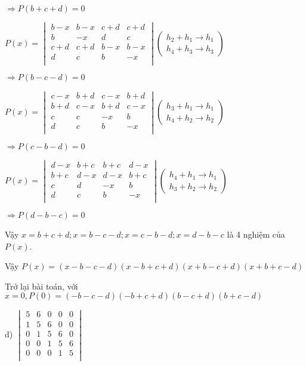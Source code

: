 \documentclass[12pt]{report}
\begin{document}
$\Rightarrow P(b+c+d) = 0$

$P(x) = \begin{vmatrix}
	b-x & b-x & c+d & c+d \\
	b & -x & d & c \\
	c+d & c+d & b-x & b-x \\
	d & c & b & -x \\
\end{vmatrix} \left( \begin{smallmatrix}
h_2+h_1 \to h_1\\
h_4+h_3 \to h_3
\end{smallmatrix} \right)$

$\Rightarrow P(b-c-d) = 0$

$P(x) = \begin{vmatrix}
	c-x & b+d & c-x & b+d \\
	b+d & c-x & b+d & c-x \\
	c & c & -x & b \\
	d & c & b & -x \\
\end{vmatrix} \left( \begin{smallmatrix}
	h_3+h_1 \to h_1\\
	h_4+h_2 \to h_2
\end{smallmatrix} \right)$

$\Rightarrow P(c-b-d) = 0$

$P(x) = \begin{vmatrix}
	d-x & b+c & b+c & d-x \\
	b+c & d-x & d-x & b+c \\
	c & d & -x & b \\
	d & c & b & -x \\
\end{vmatrix} \left( \begin{smallmatrix}
	h_4+h_1 \to h_1\\
	h_3+h_2 \to h_2
\end{smallmatrix} \right)$

$\Rightarrow P(d-b-c) = 0$

Vậy $x=b+c+d; x=b-c-d; x=c-b-d; x=d-b-c$ là 4 nghiệm của $P(x)$.

Vậy $P(x)=(x-b-c-d)(x-b+c+d)(x+b-c+d)(x+b+c-d)$  

Trở lại bài toán, với $x = 0, P(0) = (-b-c-d)(-b+c+d)(b-c+d)(b+c-d)$

d) $\begin{vmatrix}
	5 & 6 & 0 & 0 & 0 \\
	1 & 5 & 6 & 0 & 0 \\
	0 & 1 & 5 & 6 & 0 \\
	0 & 0 & 1 & 5 & 6 \\
	0 & 0 & 0 & 1 & 5 \\
\end{vmatrix}$
\end{document}
